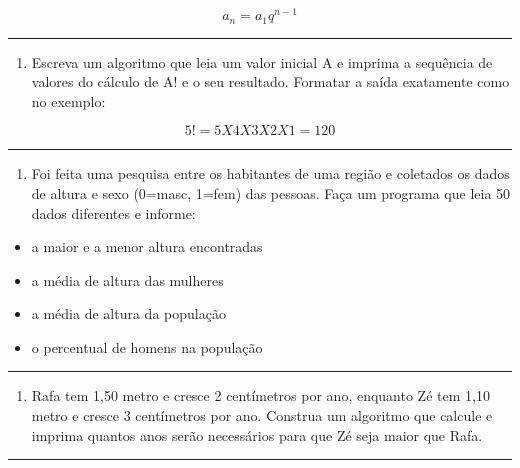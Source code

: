 \documentclass[12pt,a4paper]{article}
\providecommand{\tightlist}{%
      \setlength{\itemsep}{0pt}\setlength{\parskip}{0pt}}
\begin{document}
\[a_n = a_1q^{n-1}\]

    \begin{center}\rule{0.5\linewidth}{0.5pt}\end{center}

\begin{enumerate}
\def\labelenumi{\arabic{enumi}.}
\setcounter{enumi}{5}
\tightlist
\item
  Escreva um algoritmo que leia um valor inicial A e imprima a sequência
  de valores do cálculo de A! e o seu resultado. Formatar a saída
  exatamente como no exemplo:
\end{enumerate}

\[5! = 5 X 4 X 3 X 2 X 1 = 120\]

    \begin{center}\rule{0.5\linewidth}{0.5pt}\end{center}

\begin{enumerate}
\def\labelenumi{\arabic{enumi}.}
\setcounter{enumi}{6}
\tightlist
\item
  Foi feita uma pesquisa entre os habitantes de uma região e coletados
  os dados de altura e sexo (0=masc, 1=fem) das pessoas. Faça um
  programa que leia 50 dados diferentes e informe:
\end{enumerate}

\begin{itemize}
\tightlist
\item
  a maior e a menor altura encontradas
\item
  a média de altura das mulheres
\item
  a média de altura da população
\item
  o percentual de homens na população
\end{itemize}

    \begin{center}\rule{0.5\linewidth}{0.5pt}\end{center}

\begin{enumerate}
\def\labelenumi{\arabic{enumi}.}
\setcounter{enumi}{7}
\tightlist
\item
  Rafa tem 1,50 metro e cresce 2 centímetros por ano, enquanto Zé tem
  1,10 metro e cresce 3 centímetros por ano. Construa um algoritmo que
  calcule e imprima quantos anos serão necessários para que Zé seja
  maior que Rafa.
\end{enumerate}

    \begin{center}\rule{0.5\linewidth}{0.5pt}\end{center}
\end{document}
